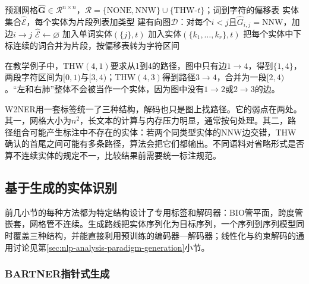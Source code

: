 \begin{algorithm}[W2NER网格解码]
  \label{alg:nlp-extraction-w2ner-decode}
  \begin{algorithmic}[1]
    \Require 预测网格$\hat{\bm G}\in\mathcal R^{n\times n}$，$\mathcal R=\{\mathrm{NONE},\mathrm{NNW}\}\cup\{\mathrm{THW}\text{-}t\}$；词到字符的偏移表
    \Ensure 实体集合$\hat{\mathcal E}$，每个实体为片段列表加类型
    \State 建有向图$\mathcal D$：对每个$i<j$且$\hat G_{i,j}=\mathrm{NNW}$，加边$i\to j$
    \State $\hat{\mathcal E}\gets\varnothing$
     
        \State 加入单词实体$(\{j\},t)$
      \Else
          \State 加入实体$(\{k_1,\ldots,k_r\},t)$
        \EndFor
      \EndIf
    \EndFor
    \State 把每个实体中下标连续的词合并为片段，按偏移表转为字符区间
  \end{algorithmic}
\end{algorithm}

在教学例子中，THW$(4,1)$要求从1到4的路径，图中只有边$1\to4$，得到$\{1,4\}$，两段字符区间为$[0,1)$与$[3,4)$；THW$(4,3)$得到路径$3\to4$，合并为一段$[2,4)$。“左和右肺”整体不会被当作一个实体，因为图中没有$1\to2$或$2\to3$的边。

W2NER用一套标签统一了三种结构，解码也只是图上找路径。它的弱点在两处。其一，网格大小为$n^2$，长文本的计算与内存压力明显，通常按句处理。其二，路径组合可能产生标注中不存在的实体：若两个同类型实体的NNW边交错，THW确认的首尾之间可能有多条路径，算法会把它们都输出。不同语料对省略形式是否算不连续实体的规定不一，比较结果前需要统一标注规范。

\subsection{基于生成的实体识别}
\label{sec:nlp-extraction-ner-generation}

前几小节的每种方法都为特定结构设计了专用标签和解码器：BIO管平面，跨度管嵌套，网格管不连续。生成路线把实体序列化为目标序列，一个序列到序列模型同时覆盖三种结构，并能直接利用预训练的编码器—解码器；线性化与约束解码的通用讨论见第\ref{sec:nlp-analysis-paradigm-generation}小节。

\subsubsection{BARTNER指针式生成}
\label{sec:nlp-extraction-bartner}

